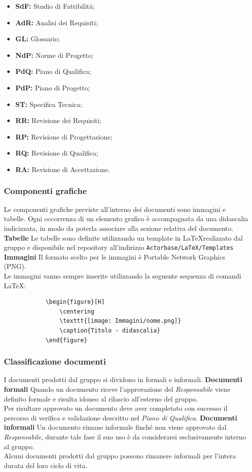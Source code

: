 \documentclass[a4paper]{article}
\begin{document}
		\begin{itemize}
			\item \textbf{SdF:} Studio di Fattibilità;
			\item \textbf{AdR:} Analisi dei Requisiti;
			\item \textbf{GL:} Glossario;
			\item \textbf{NdP:} Norme di Progetto;
			\item \textbf{PdQ:} Piano di Qualifica;
			\item \textbf{PdP:} Piano di Progetto;
			\item \textbf{ST:} Specifica Tecnica;
			\item \textbf{RR:} Revisione dei Requisiti;
			\item \textbf{RP:} Revisione di Progettazione;
			\item \textbf{RQ:} Revisione di Qualifica;
			\item \textbf{RA:} Revisione di Accettazione.
		\end{itemize}
		\subsubsection{Componenti grafiche}
		Le componenti grafiche previste all'interno dei documenti sono immagini e tabelle. Ogni occorrenza di un
		elemento grafico è accompagnata da una didascalia indicizzata, in modo da poterla associare alla sezione
		relativa del documento.
		\textbf{Tabelle}
		Le tabelle sono definite utilizzando un template in \LaTeX \space realizzato dal gruppo e disponibile nel
		repository all'indirizzo \verb|Actorbase/LaTeX/Templates|
		\textbf{Immagini}
		Il formato scelto per le immagini è Portable Network Graphics (PNG). \\
		Le immagini vanno sempre inserite utilizzando la seguente sequenza di comandi \LaTeX:
		\begin{verbatim}
			\begin{figure}[H]
				\centering
				\texttt{[image: Immagini/nome.png]}
				\caption{Titolo - didascalia}
			\end{figure}
		\end{verbatim}
		\subsubsection{Classificazione documenti}
		I documenti prodotti dal gruppo si dividono in formali e informali.
		\textbf{Documenti formali}
		Quando un documento riceve l'approvazione del \emph{Responsabile} viene definito formale e risulta idoneo
		al rilascio all'esterno del gruppo. \\
		Per risultare approvato un documento deve aver completato con successo il percorso di verifica e validazione
		descritto nel \emph{Piano di Qualifica}.
		\textbf{Documenti informali}
		Un documento rimane informale finché non viene approvato dal \emph{Responsabile}, durante tale fase
		il suo uso è da considerarsi esclusivamente interno al gruppo. \\
		Alcuni documenti prodotti dal gruppo possono rimanere informali per l'intera durata del loro ciclo di vita.
\end{document}
